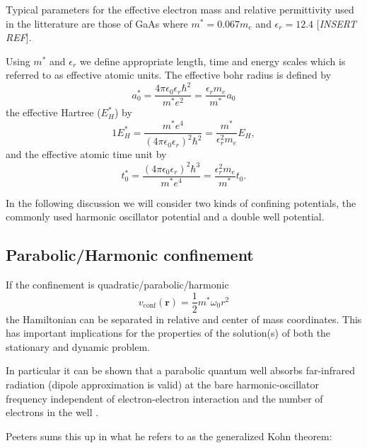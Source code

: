\documentclass[aip,jcp,reprint,floatfix]{revtex4-1}
\newcommand \mycomment[1]   {{\color{red} [{\it {#1}}]}}
\begin{document}
    Typical parameters for the effective electron mass and relative permittivity used in the litterature are those of GaAs where $m^* = 0.067 m_e$ and $\epsilon_r = 12.4$ \mycomment{INSERT REF}.
    
    Using $m^*$ and $\epsilon_r$ we define appropriate length, time and energy scales which is referred to as effective atomic units. The effective bohr radius is defined by 
    \begin{equation}
        a_0^* = \frac{4\pi \epsilon_0 \epsilon_r \hbar^2}{m^* e^2} = \frac{\epsilon_r m_e}{m^*} a_0
    \end{equation}
    the effective Hartree ($E_H^*$) by
    \begin{equation}
        1E_H^* = \frac{m^* e^4}{(4\pi \epsilon_0 \epsilon_r)^2 \hbar^2} = \frac{m^*}{\epsilon_r^2 m_e} E_H,
    \end{equation}
    and the effective atomic time unit by 
    \begin{equation}
        t_0^* = \frac{(4\pi \epsilon_0 \epsilon_r)^2 \hbar^3}{m^* e^4} = \frac{\epsilon_r^2 m_e}{m^*} t_0.
    \end{equation}
    
    In the following discussion we will consider two kinds of 
    confining potentials, the commonly used harmonic oscillator potential and a double well potential. 
    
    
    \subsection{Parabolic/Harmonic confinement}
    If the confinement is quadratic/parabolic/harmonic
    \begin{equation}
        v_\text{conf}(\mathbf{r}) = \frac{1}{2}m^* \omega_0 r^2
    \end{equation}
    the Hamiltonian can be separated in relative and center of mass coordinates. This has important implications for the properties of the solution(s) of both the stationary and dynamic problem. 
    
    In particular it can be shown that a parabolic quantum well absorbs far-infrared radiation (dipole approximation is valid) at the bare harmonic-oscillator frequency independent of electron-electron interaction and the number of electrons in the well \cite{Brey_Johnson_Halerpin, Taut_QD_arrays}.
    
    Peeters\cite{Peeters_gen_Kohn_theorem} sums this up in what he refers to as the generalized Kohn theorem\cite{Kohn_theorem_1961}:
    
\end{document}
